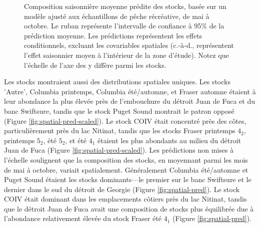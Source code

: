 \begin{figure}[H]
    \centering
    \caption{Composition saisonnière moyenne prédite des stocks, basée sur un modèle ajusté aux échantillons de pêche récréative, de mai à octobre. Le ruban représente l'intervalle de confiance à 95\% de la prédiction moyenne. Les prédictions représentent les effets conditionnels, excluant les covariables spatiales (c.-à-d., représentent l'effet saisonnier moyen à l'intérieur de la zone d'étude). Notez que l'échelle de l'axe des y diffère parmi les stocks.}
    \label{fig:season-pred-rec}
\end{figure}

Les stocks montraient aussi des distributions spatiales uniques. Les stocks 'Autre', Columbia printemps, Columbia été/automne, et Fraser automne étaient à leur abondance la plus élevée près de l'embouchure du détroit Juan de Fuca et du banc Swiftsure, tandis que le stock Puget Sound montrait le patron opposé (Figure \ref{fig:spatial-pred-scaled}). Le stock COIV était concentré près des côtes, particulièrement près du lac Nitinat, tandis que les stocks Fraser printemps $4_2$, printemps $5_2$, été $5_2$, et été $4_1$ étaient les plus abondants au milieu du détroit Juan de Fuca (Figure \ref{fig:spatial-pred-scaled}). Les prédictions non mises à l'échelle soulignent que la composition des stocks, en moyennant parmi les mois de mai à octobre, variait spatialement. Généralement Columbia été/automne et Puget Sound étaient les stocks dominants---le premier sur le banc Swiftsure et le dernier dans le sud du détroit de Georgie (Figure \ref{fig:spatial-pred}). Le stock COIV était dominant dans les emplacements côtiers près du lac Nitinat, tandis que le détroit Juan de Fuca avait une composition de stocks plus équilibrée due à l'abondance relativement élevée du stock Fraser été $4_1$ (Figure \ref{fig:spatial-pred}).

